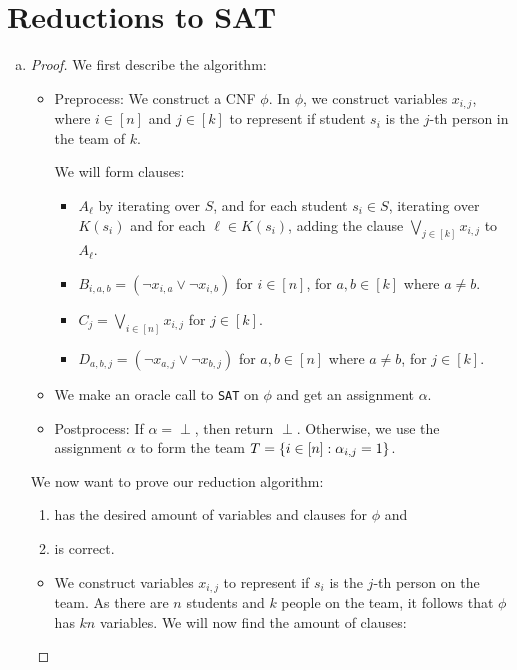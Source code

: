 \documentclass[11pt]{scrartcl}
\theoremstyle{dotlessP}
\theoremstyle{dotlessN}
\DeclarePairedDelimiter\set{\{}{\}}
\begin{document}
\section{Reductions to SAT}
\begin{enumerate}[(a)]
	\item 
		\begin{proof}
			We first describe the algorithm:
			\begin{itemize}
				\item Preprocess: We construct a CNF $\phi$. In  $\phi$, we construct variables $x_{i,j}$, where $i \in [n]$ and $j \in [k]$ to represent if student $s_i$ is the $j$-th person in the team of $k$.

					We will form clauses:
					\begin{itemize}
						\item $A_\ell$ by iterating over $S$, and for each student $s_i \in S$, iterating over $K(s_i)$ and for each $\ell \in K(s_i)$, adding the clause $\bigvee\limits_{j \in [k]}x_{i,j}$ to $A_\ell$. 
						\item $B_{i,a,b} = (\neg x_{i,a} \lor \neg x_{i,b}) $ for $i \in [n]$, for $a,b \in [k]$ where $a \neq b$. 
						\item $C_j = \bigvee\limits_{i \in [n]}x_{i, j}$ for $j \in [k]$. 
						\item $D_{a,b,j} = (\neg x_{a,j} \lor \neg x_{b,j})$ for $a,b \in [n]$ where $a \neq b$, for $j \in [k]$. 
					\end{itemize}
						\item We make an oracle call to \texttt{SAT} on $\phi$ and get an assignment $\alpha$.
						\item Postprocess: If $\alpha = \perp$, then return $\perp$. Otherwise, we use the assignment $\alpha$ to form the team $T = \set*{i \in [n] : \alpha_{i,j} = 1}$.
			\end{itemize}
			We now want to prove our reduction algorithm:
			\begin{enumerate}[1.]
				\item has the desired amount of variables and clauses for $\phi$ and
				\item is correct.
			\end{enumerate}
			\begin{itemize}
				\item We construct variables $x_{i,j}$ to represent if $s_i$ is the $j$-th person on the team. As there are $n$ students and $k$ people on the team, it follows that $\phi$ has $kn$ variables. We will now find the amount of clauses:

\end{itemize}
\end{proof}
\end{enumerate}
\end{document}
